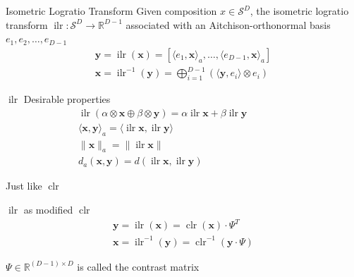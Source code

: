 \documentclass[dark]{cgem-presentation}
\DeclareMathOperator{\clr}{\operatorname{clr}}
\DeclareMathOperator{\ilr}{\operatorname{ilr}}
\begin{document}
\begin{frame}{Isometric Logratio Transform}
	\LARGE
	\vspace{5mm}
	Given composition $x \in \mathcal{S}^D$, the
	\textcolor{SecondColor}{isometric logratio transform}
	$\ilr : \mathcal{S}^D \rightarrow \mathbb{R}^{D-1}$ associated
	with an Aitchison-orthonormal basis $e_1, e_2, \ldots , e_{D-1}$
	\vspace{5mm}
	\begin{gather*}
		\mathbf{y} = \ilr(\mathbf{x}) = 
		[ \langle e_1, \mathbf{x} \rangle_a, \ldots ,
		\langle e_{D-1}, \mathbf{x} \rangle_a ] \\[4mm]
		\mathbf{x} = \ilr^{-1}(\mathbf{y}) = 
		\bigoplus_{i=1}^{D-1} ( \langle \mathbf{y}, e_i \rangle
		\otimes e_i )
	\end{gather*}

	\vspace{0.2mm}
	\large
	\begin{flushright}
		\cite{Egozcue2003}
	\end{flushright}
\end{frame}

\begin{frame}{$\ilr$}
	\LARGE
	\vspace{3mm}
	Desirable properties
	\begin{align*}
		&\ilr(\alpha \otimes \mathbf{x} \oplus \beta
		\otimes \mathbf{y}) = \alpha \ilr \mathbf{x}
		+ \beta \ilr \mathbf{y} \quad \quad \quad \quad \quad \\
		&\langle \mathbf{x}, \mathbf{y} \rangle_a =
		\langle \ilr \mathbf{x}, \ilr \mathbf{y} \rangle \\
		&\| \mathbf{x} \|_a = \| \ilr \mathbf{x} \| \\
		&d_a( \mathbf{x}, \mathbf{y} ) = d(\ilr \mathbf{x},
		\ilr \mathbf{y} )
	\end{align*}

	\vspace{5mm}
	\textcolor{SecondColor}{Just like $\clr$}
\end{frame}

\begin{frame}{$\ilr$ as modified $\clr$}
	\LARGE
	\begin{gather*}
		\mathbf{y} = \ilr(\mathbf{x}) = 
		\clr(\mathbf{x}) \cdot \Psi^T \\[2mm]
		\mathbf{x} = \ilr^{-1}(\mathbf{y}) =
		\clr^{-1}( \mathbf{y} \cdot \Psi )
	\end{gather*}

	\vspace{5mm}
	$\Psi \in \mathbb{R}^{(D-1) \times D}$ is called the 
	\textcolor{ThirdColor}{contrast matrix}
\end{frame}
\end{document}
